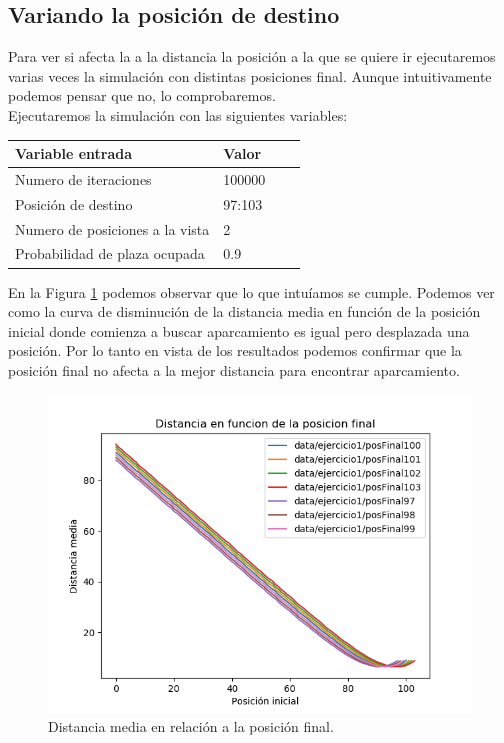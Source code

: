 \documentclass[12pt,a4paper]{article}
\begin{document}
\subsection{Variando la posición de destino}
Para ver si afecta la a la distancia la posición a la que se quiere ir ejecutaremos varias veces la simulación con distintas posiciones final. Aunque intuitivamente podemos pensar que no, lo comprobaremos. \\ Ejecutaremos la simulación con las siguientes variables:
\begin{table}[H]
	\centering
	\begin{tabular}{|l|l|l|l|}
		\hline
		\textbf{Variable entrada} & \textbf{Valor}\\ \hline
		Numero de iteraciones&100000\\ \hline
		Posición de destino&97:103\\ \hline
		Numero de posiciones a la vista&2\\ \hline
		Probabilidad de plaza ocupada&0.9\\ \hline
	\end{tabular}
\end{table}
En la Figura \ref{fig:distanciaPosFinal} podemos observar que lo que intuíamos se cumple. Podemos ver como la curva de disminución de la distancia media en función de la posición inicial donde comienza a buscar aparcamiento es igual pero desplazada una posición. Por lo tanto  en vista de los resultados podemos confirmar que la posición final no afecta a la mejor distancia para encontrar aparcamiento.
\begin{figure}[H]
	\centering
	\includegraphics{images/distanciaPosFinal.png}
	\caption{Distancia media en relación a la posición final.}
	\label{fig:distanciaPosFinal}
\end{figure}
\end{document}
